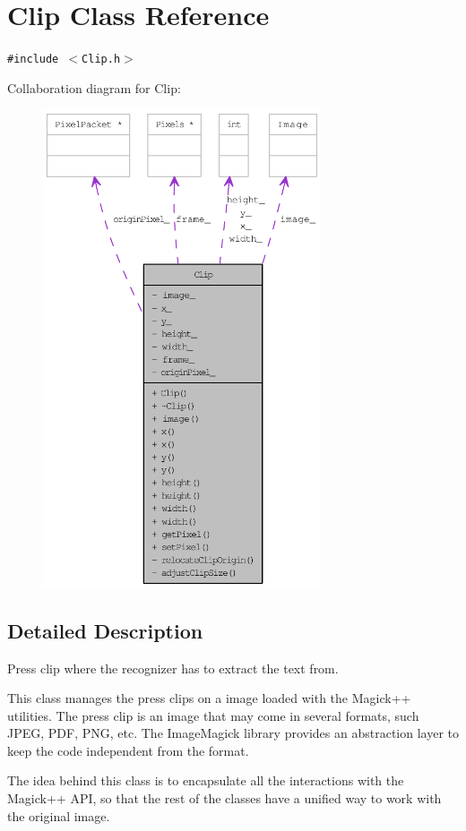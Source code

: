 \hypertarget{class_clip}{
\section{Clip Class Reference}
\label{class_clip}
}
{\tt \#include $<$Clip.h$>$}

Collaboration diagram for Clip:\nopagebreak
\begin{figure}[H]
\begin{center}
\leavevmode
\includegraphics[height=400pt]{class_clip__coll__graph}
\end{center}
\end{figure}


\subsection{Detailed Description}
Press clip where the recognizer has to extract the text from. 

This class manages the press clips on a image loaded with the Magick++ utilities. The press clip is an image that may come in several formats, such JPEG, PDF, PNG, etc. The ImageMagick library provides an abstraction layer to keep the code independent from the format.

The idea behind this class is to encapsulate all the interactions with the Magick++ API, so that the rest of the classes have a unified way to work with the original image.

